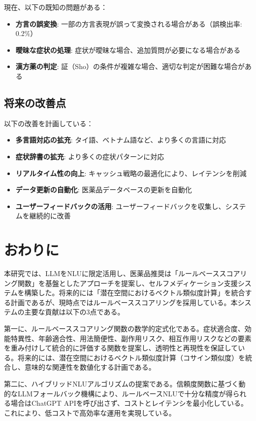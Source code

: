 \documentclass[a4paper,11pt,ja=standard,xelatex]{bxjsarticle}
\theoremstyle{definition}
\begin{document}
現在、以下の既知の問題がある：

\begin{itemize}
\item \textbf{方言の誤変換}: 一部の方言表現が誤って変換される場合がある（誤検出率: 0.2\%）
\item \textbf{曖昧な症状の処理}: 症状が曖昧な場合、追加質問が必要になる場合がある
\item \textbf{漢方薬の判定}: 証（Sho）の条件が複雑な場合、適切な判定が困難な場合がある
\end{itemize}

\subsection{将来の改善点}

以下の改善を計画している：

\begin{itemize}
\item \textbf{多言語対応の拡充}: タイ語、ベトナム語など、より多くの言語に対応
\item \textbf{症状辞書の拡充}: より多くの症状パターンに対応
\item \textbf{リアルタイム性の向上}: キャッシュ戦略の最適化により、レイテンシを削減
\item \textbf{データ更新の自動化}: 医薬品データベースの更新を自動化
\item \textbf{ユーザーフィードバックの活用}: ユーザーフィードバックを収集し、システムを継続的に改善
\end{itemize}

\section{おわりに}

本研究では、LLMをNLUに限定活用し、医薬品推奨は「ルールベーススコアリング関数」を基盤としたアプローチを提案し、セルフメディケーション支援システムを構築した。将来的には「潜在空間におけるベクトル類似度計算」を統合する計画であるが、現時点ではルールベーススコアリングを採用している。本システムの主要な貢献は以下の3点である。

第一に、ルールベーススコアリング関数の数学的定式化である。症状適合度、効能特異性、年齢適合性、用法簡便性、副作用リスク、相互作用リスクなどの要素を重み付けして統合的に評価する関数を提案し、透明性と再現性を保証している。将来的には、潜在空間におけるベクトル類似度計算（コサイン類似度）を統合し、意味的な関連性を数値化する計画である。

第二に、ハイブリッドNLUアルゴリズムの提案である。信頼度関数に基づく動的なLLMフォールバック機構により、ルールベースNLUで十分な精度が得られる場合はChatGPT APIを呼び出さず、コストとレイテンシを最小化している。これにより、低コストで高効率な運用を実現している。
\end{document}
